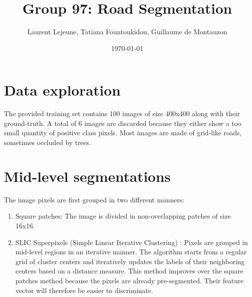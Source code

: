 \documentclass[10pt,conference,compsocconf]{IEEEtran}
\author{Laurent Lejeune, Tatiana Fountoukidou, Guillaume de Montauzon}
\date{\today}
\title{Group 97: Road Segmentation}
\begin{document}
\maketitle
\section{Data exploration}
\label{sec:orgheadline1}
The provided training set contains 100 images of size 400x400 along with their ground-truth. A total of 6 images are discarded because they either show a too small quantity of positive class pixels. 
Most images are made of grid-like roads, sometimes occluded by trees. 
\section{Mid-level segmentations}
\label{sec:orgheadline2}
The image pixels are first grouped in two different manners:
\begin{enumerate}
\item Square patches: The image is divided in non-overlapping patches of size 16x16.
\item SLIC Superpixels (Simple Linear Iterative Clustering) \cite{achanta12}: Pixels are grouped in mid-level regions in an iterative manner. The algorithm starts from a regular grid of cluster centers and iteratively updates the labels of their neighboring centers based on a distance measure. This method improves over the square patches method because the pixels are already pre-segmented. Their feature vector will therefore be easier to discriminate.
\end{enumerate}
\end{document}
